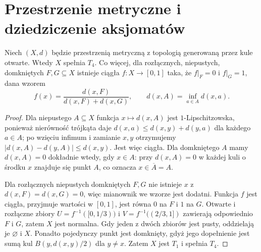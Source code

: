 \FloatBarrier

\section{Przestrzenie metryczne i dziedziczenie aksjomatów}
\label{sec:topog-metryczne-dziedziczenie}

\begin{twierdzenie}
\label{thm:topog-metryczne-t4}
Niech $(X,d)$ będzie przestrzenią metryczną z topologią
generowaną przez kule otwarte. Wtedy $X$ spełnia $T_4$.
Co więcej, dla rozłącznych, niepustych, domkniętych
$F,G\subseteq X$ istnieje ciągła $f\colon X\to[0,1]$
taka, że $f|_F=0$ i $f|_G=1$, dana wzorem
\[
f(x)=\frac{d(x,F)}{d(x,F)+d(x,G)},\qquad
d(x,A)=\inf_{a\in A}d(x,a).
\]
\end{twierdzenie}
\begin{proof}
Dla niepustego $A\subseteq X$ funkcja $x\mapsto d(x,A)$
jest $1$-Lipschitzowska, ponieważ nierówność trójkąta daje
$d(x,a)\le d(x,y)+d(y,a)$ dla każdego $a\in A$;
po wzięciu infimum i zamianie $x,y$ otrzymujemy
$|d(x,A)-d(y,A)|\le d(x,y)$. Jest więc ciągła.
Dla domkniętego $A$ mamy $d(x,A)=0$ dokładnie wtedy,
gdy $x\in A$: przy $d(x,A)=0$ w każdej kuli o środku $x$
znajduje się punkt $A$, co oznacza $x\in\overline A=A$.

Dla rozłącznych niepustych domkniętych $F,G$
nie istnieje $x$ z $d(x,F)=d(x,G)=0$, więc mianownik
we wzorze jest dodatni. Funkcja $f$ jest ciągła,
przyjmuje wartości w $[0,1]$, jest równa $0$ na $F$
i $1$ na $G$. Otwarte i rozłączne zbiory
$U=f^{-1}([0,1/3))$ i $V=f^{-1}((2/3,1])$
zawierają odpowiednio $F$ i $G$, zatem $X$ jest normalna.
Gdy jeden z dwóch zbiorów jest pusty, oddzielają je
$\varnothing$ i $X$.
Ponadto pojedynczy punkt jest domknięty,
gdyż jego dopełnienie jest sumą kul
$B(y,d(x,y)/2)$ dla $y\ne x$. Zatem $X$ jest $T_1$
i spełnia $T_4$.
\end{proof}


